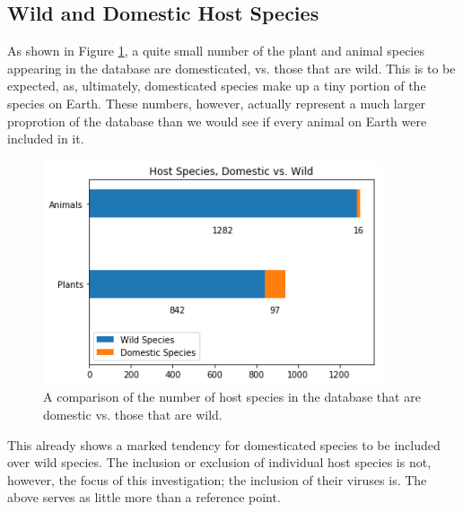 \documentclass[12pt]{article}
\begin{document}
    \subsection{Wild and Domestic Host Species}

    As shown in Figure \ref{host_species_domestic_wild_figure}, a quite small
    number of the plant and animal species appearing in the database are
    domesticated, vs. those that are wild. This is to be expected, as,
    ultimately, domesticated species make up a tiny portion of the species
    on Earth. These numbers, however, actually represent a much larger
    proprotion of the database than we would see if every animal on Earth
    were included in it.

    \begin{figure}[H]
        \begin{center}
            \includegraphics[width=100mm]{host_species_domestic_wild_figure.png}
            \caption{A comparison of the number of host species in the database
            that are domestic vs. those that are wild.}
            \label{host_species_domestic_wild_figure}
        \end{center}
    \end{figure}
    
    This already shows a marked tendency for domesticated species to be included
    over wild species. The inclusion or exclusion of individual host species is
    not, however, the focus of this investigation; the inclusion of their viruses
    is. The above serves as little more than a reference point.
    
\end{document}
